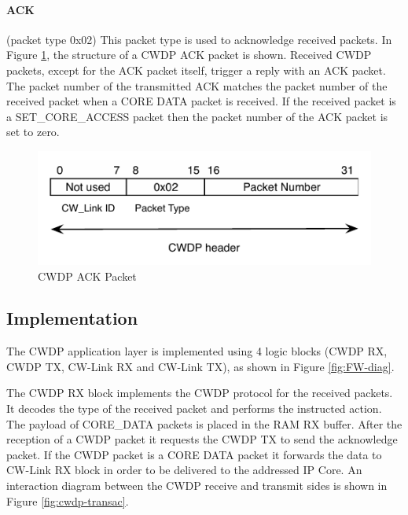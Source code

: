 \documentclass[defaultstyle,10pt,master,Helvetica]{thesis}
\begin{document}
\paragraph*{ACK} (packet type 0x02) This packet type is used to acknowledge received packets. In Figure \ref{fig:cwdp-ack}, the structure of a \ac{CWDP} ACK packet is shown. Received \ac{CWDP} packets, except for the \ac{ACK} packet itself, trigger a reply with an \ac{ACK} packet. The packet number of the transmitted \ac{ACK} matches the packet number of the received packet when a CORE DATA packet is received. If the received packet is a SET\_CORE\_ACCESS packet then the packet number of the \ac{ACK} packet is set to zero.

\begin{figure}[h]
  \centering
      \includegraphics[scale=1]{Diagrams/CWDP-Ack.pdf}
  \caption{\ac{CWDP} ACK Packet}
  \label{fig:cwdp-ack}
\end{figure}
\clearpage


\subsection{Implementation}

The \ac{CWDP} application layer is implemented using 4 logic blocks (\ac{CWDP} RX, \ac{CWDP} TX, CW-Link RX and CW-Link TX), as shown in Figure \ref{fig:FW-diag}.

The \ac{CWDP} RX block implements the \ac{CWDP} protocol for the received packets. It decodes the type of the received packet and performs the instructed action. The payload of CORE\_DATA packets is placed in the \acs{RAM} RX buffer. After the reception of a \ac{CWDP} packet it requests the \ac{CWDP} TX to send the acknowledge packet. If the \ac{CWDP} packet is a CORE DATA packet it forwards the data to CW-Link RX block in order to be delivered to the addressed \ac{IP} Core. An interaction diagram between the CWDP receive and transmit sides is shown in Figure \ref{fig:cwdp-transac}.
\end{document}
